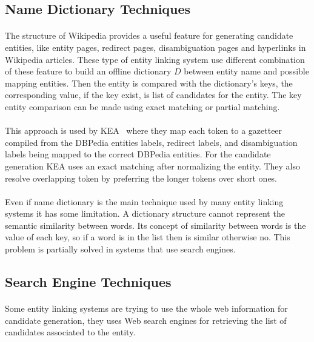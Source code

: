 \subsection{Name Dictionary Techniques}
\paragraph{}
The structure of Wikipedia provides a useful feature for generating candidate entities, like entity pages, redirect pages, disambiguation pages and hyperlinks in Wikipedia articles. These type of entity linking system use different combination of these feature to build an offline dictionary $D$ between entity name and possible mapping entities. Then the entity is compared with the dictionary's keys, the corresponding value, if the key exist, is list of candidates for the entity. The key entity comparison can be made using exact matching or partial matching. 

\paragraph{}
This approach is used by KEA~\cite{waitelonisnamed} where they map each token to a gazetteer compiled from the DBPedia entities labels, redirect labels, and disambiguation labels being mapped to the correct DBPedia entities. For the candidate generation KEA uses an exact matching  after normalizing the entity. They also resolve overlapping token by preferring the longer tokens over short ones.

\paragraph{}
Even if name dictionary is the main technique used by many entity linking systems it has some limitation. A dictionary structure cannot represent the semantic similarity between words. Its concept of similarity between words is the value of each key, so if a word is in the list then is similar otherwise no. This problem is partially solved in systems that use search engines. 

\subsection{Search Engine Techniques}
\paragraph{}
Some entity linking systems are trying to use the whole web information for candidate generation, they uses Web search engines for retrieving the list of candidates associated to the entity.

